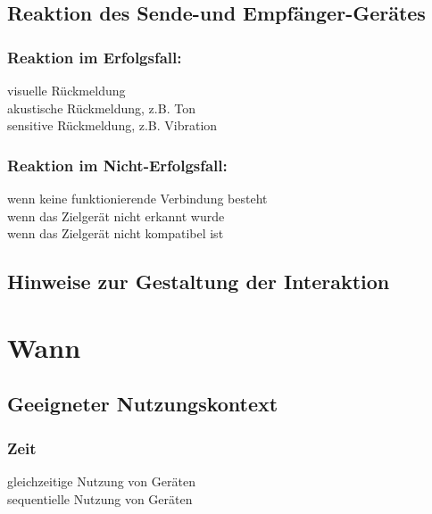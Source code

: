\subsection*{Reaktion des Sende-und Empfänger-Gerätes}
\reaction

\subsubsection*{Reaktion im Erfolgsfall:}
\checkbox{\reactionSuccessVisual} visuelle Rückmeldung \\
\checkbox{\reactionSuccessAcustic} akustische Rückmeldung, z.B. Ton \\
\checkbox{\reactionSuccessSensitive} sensitive Rückmeldung, z.B. Vibration

\subsubsection*{Reaktion im Nicht-Erfolgsfall:}
\checkbox{\reactionFailureConnection} wenn keine funktionierende Verbindung besteht \reactionFailureConnectionDesc \\
\checkbox{\reactionFailureNoDevice} wenn das Zielgerät nicht erkannt wurde \reactionFailureNoDeviceDesc \\
\checkbox{\reactionFailureCompatibility} wenn das Zielgerät nicht kompatibel ist \reactionFailureCompatibilityDesc

\subsection*{Hinweise zur Gestaltung der Interaktion}
\designnotes


\section*{Wann}

\subsection*{Geeigneter Nutzungskontext}
\validcontext

\subsubsection*{Zeit}
\checkbox{\simultaneously} gleichzeitige Nutzung von Geräten \\
\checkbox{\sequentially} sequentielle Nutzung von Geräten 


